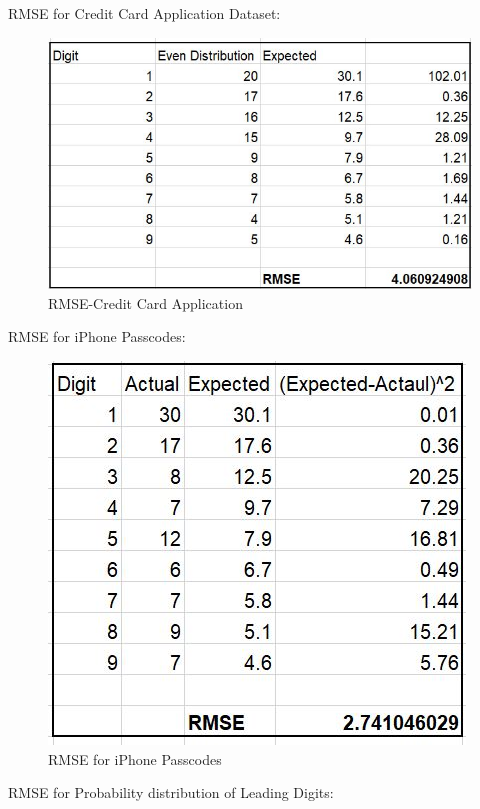 RMSE for Credit Card Application Dataset:
\begin{figure}[!ht]
\centering\includegraphics[width=\columnwidth]{images/rmse_cc_app.JPG}
  \caption{RMSE-Credit Card Application}\label{f:rmse-cc-app}
\end{figure}

RMSE for iPhone Passcodes:
\begin{figure}[!ht]
\centering\includegraphics[width=\columnwidth]{images/rmse_iphone_cd.JPG}
  \caption{RMSE for iPhone Passcodes}\label{f:rmse-iphone-cd}
\end{figure}

RMSE for Probability distribution of Leading Digits:


